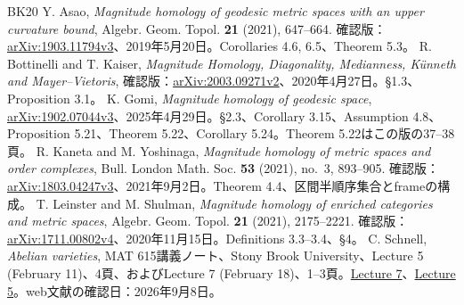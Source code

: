 \documentclass[12pt]{amsart}
\theoremstyle{definition}
\theoremstyle{remark}
\numberwithin{equation}{section}
\begin{document}
\begin{thebibliography}{BK20}
 Y. Asao, \emph{Magnitude homology of geodesic metric spaces with an upper curvature bound}, Algebr. Geom. Topol. \textbf{21} (2021), 647--664. 確認版：\href{https://arxiv.org/abs/1903.11794v3}{arXiv:1903.11794v3}、2019年5月20日。Corollaries 4.6, 6.5、Theorem 5.3。
 R. Bottinelli and T. Kaiser, \emph{Magnitude Homology, Diagonality, Medianness, K\"unneth and Mayer--Vietoris}, 確認版：\href{https://arxiv.org/abs/2003.09271v2}{arXiv:2003.09271v2}、2020年4月27日。\S1.3、Proposition 3.1。
 K. Gomi, \emph{Magnitude homology of geodesic space}, \href{https://arxiv.org/abs/1902.07044v3}{arXiv:1902.07044v3}、2025年4月29日。\S2.3、Corollary 3.15、Assumption 4.8、Proposition 5.21、Theorem 5.22、Corollary 5.24。Theorem 5.22はこの版の37--38頁。
 R. Kaneta and M. Yoshinaga, \emph{Magnitude homology of metric spaces and order complexes}, Bull. London Math. Soc. \textbf{53} (2021), no.~3, 893--905. 確認版：\href{https://arxiv.org/abs/1803.04247v3}{arXiv:1803.04247v3}、2021年9月2日。Theorem 4.4、区間半順序集合とframeの構成。
 T. Leinster and M. Shulman, \emph{Magnitude homology of enriched categories and metric spaces}, Algebr. Geom. Topol. \textbf{21} (2021), 2175--2221. 確認版：\href{https://arxiv.org/abs/1711.00802v4}{arXiv:1711.00802v4}、2020年11月15日。Definitions 3.3--3.4、\S4。
 C. Schnell, \emph{Abelian varieties}, MAT 615講義ノート、Stony Brook University、Lecture 5 (February 11)、4頁、およびLecture 7 (February 18)、1--3頁。\href{https://www.math.stonybrook.edu/~cschnell/mat615/lectures/lecture7.pdf}{Lecture 7}、\href{https://www.math.stonybrook.edu/~cschnell/mat615/lectures/lecture5.pdf}{Lecture 5}。web文献の確認日：2026年9月8日。
\end{thebibliography}
\end{document}
